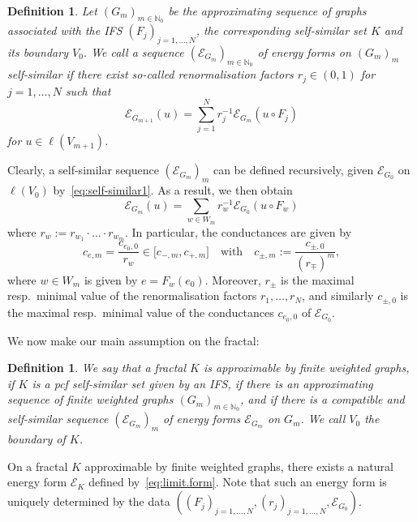 \documentclass[12pt,reqno,a4paper]{amsart}            %
\numberwithin{equation}{section}
\theoremstyle{mythmstyle}       %
\theoremstyle{mydefstyle}        %
\newtheorem{definition}[theorem]{Definition}
\newcommand{\N}{\mathbb{N}} %
\newcommand{\1}{\mathbbm 1}                    %
\newcommand{\lsymb}    {\ell}          %
\newcommand{\quadtext}[1]{\quad\text{#1}\quad}
\newcommand{\pcf}{pcf\xspace}
\newcommand{\energy}{\mathcal E}
\newcommand{\conductance}{c}  %
\newcommand{\lspace}[1]{\lsymb({#1})}   %
\begin{document}
\begin{definition}
  \label{def:forms.self-similar}
  Let $(G_m)_{m \in \N_0 }$ be the approximating sequence of graphs
  associated with the IFS $(F_j)_{j=1,\dots,N}$, the corresponding
  self-similar set $K$ and its boundary $V_0$.  We call a sequence
  $(\energy_{G_m})_{m \in \N_0}$ of energy forms on $(G_m)_m$
  \emph{self-similar} if there exist so-called \emph{renormalisation
    factors} $r_j \in (0,1)$ for $j=1,\dots,N$ such that
  \begin{equation}
    \label{eq:self-similar1}
    \energy_{G_{m+1}}(u)
    =\sum_{j=1}^N r_j^{-1} \energy_{G_m}(u\circ F_j)
  \end{equation}
  for $u \in \lspace{V_{m+1}}$.
\end{definition}
Clearly, a self-similar sequence $(\energy_{G_m})_m$ can be defined
recursively, given $\energy_{G_0}$ on $\lspace{V_0}$
by~\eqref{eq:self-similar1}.  As a result, we then obtain
\begin{equation}
  \label{eq:self-similar2}
  \energy_{G_m}(u)
  = \sum_{w \in W_m} r_w^{-1} \energy_{G_0}(u \circ F_w)
\end{equation}
where $r_w:=r_{w_1}\cdot \ldots \cdot r_{w_m}$.  In particular, the
conductances are given by
\begin{equation}
  \label{eq:tau.est}
  \conductance_{e,m} = \frac {\conductance_{e_0,0}}{r_w} 
  \in \bigl[\conductance_{-,m},\conductance_{+,m} \bigr]
  \quadtext{with}
  \conductance_{\pm,m}
  :=\frac{\conductance_{\pm,0}}{(r_\mp)^m},
\end{equation}
where $w \in W_m$ is given by $e=F_w(e_0)$.  Moreover, $r_\pm$ is the
maximal resp.\ minimal value of the renormalisation factors
$r_1,\dots,r_N$, and similarly $\conductance_{\pm,0}$ is the maximal
resp.\ minimal value of the conductances $\conductance_{e_0,0}$ of
$\energy_{G_0}$.

We now make our main assumption on the fractal:
\begin{definition}
  \label{def:renorm}
  We say that a fractal $K$ is \emph{approximable by finite weighted
    graphs}, if $K$ is a \pcf self-similar set given by an IFS, if
  there is an approximating sequence of finite weighted graphs
  $(G_m)_{m \in \N_0}$, and if there is a \emph{compatible and
    self-similar} sequence $(\energy_{G_m})_m$ of energy forms
  $\energy_{G_m}$ on $G_m$.  We call $V_0$ the \emph{boundary of $K$}.
\end{definition}
On a fractal $K$ approximable by finite weighted graphs, there exists
a natural energy form $\energy_K$ defined by~\eqref{eq:limit.form}.
Note that such an energy form is uniquely determined by the data
$((F_j)_{j=1,\dots,N},(r_j)_{j=1,\dots,N},\energy_{G_0})$.
\end{document}
